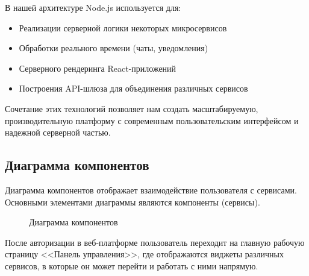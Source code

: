 В нашей архитектуре Node.js используется для:
\begin{itemize}
\item Реализации серверной логики некоторых микросервисов
\item Обработки реального времени (чаты, уведомления)
\item Серверного рендеринга React-приложений
\item Построения API-шлюза для объединения различных сервисов
\end{itemize}

Сочетание этих технологий позволяет нам создать масштабируемую, производительную платформу с современным пользовательским интерфейсом и надежной серверной частью.

\subsection{Диаграмма компонентов}

Диаграмма компонентов отображает взаимодействие пользователя с сервисами. Основными элементами диаграммы являются компоненты (сервисы).

\begin{figure}[H]
\caption{Диаграмма компонентов}
\label{comp:image}
\end{figure}

После авторизации в веб-платформе пользователь переходит на главную рабочую страницу <<Панель управления>>, где отображаются виджеты различных сервисов, в которые он может перейти и работать с ними напрямую.

